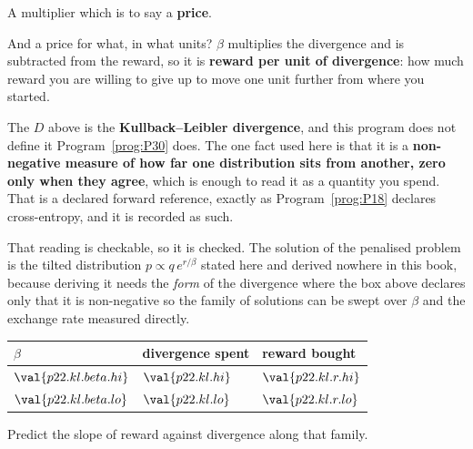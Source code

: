\begin{fr}
\begin{ansblock}
A multiplier \dash{} which is to say a \textbf{price}.
\end{ansblock}

And a price for what, in what units? $\beta$ multiplies the divergence and is
subtracted from the reward, so it is \textbf{reward per unit of divergence}:
how much reward you are willing to give up to move one unit further from where
you started.

\begin{rigourbox}
The $D$ above is the \textbf{Kullback--Leibler divergence}, and this program
does not define it \dash{} Program~\ref{prog:P30} does. The one fact used here
is that it is a \textbf{non-negative measure of how far one distribution sits
from another, zero only when they agree}, which is enough to read it as a
quantity you spend. That is a declared forward reference, exactly as
Program~\ref{prog:P18} declares cross-entropy, and it is recorded as such.
\end{rigourbox}
\end{fr}

\begin{fr}
That reading is checkable, so it is checked. The solution of the penalised
problem is the tilted distribution $p \propto q\,e^{r/\beta}$
\dash{} stated here and derived nowhere in this book, because deriving it needs
the \emph{form} of the divergence where the box above declares only that it is
non-negative \dash{} so the family of solutions can be swept over $\beta$ and
the
exchange rate measured directly.

\begin{center}
\begin{tabular}{lll}
\toprule
$\beta$ & divergence spent & reward bought \\
\midrule
$\val{p22.kl.beta.hi}$ & $\val{p22.kl.hi}$ & $\val{p22.kl.r.hi}$ \\
$\val{p22.kl.beta.lo}$ & $\val{p22.kl.lo}$ & $\val{p22.kl.r.lo}$ \\
\bottomrule
\end{tabular}
\end{center}

Predict the slope of reward against divergence along that family.
\nextframe
\end{fr}


